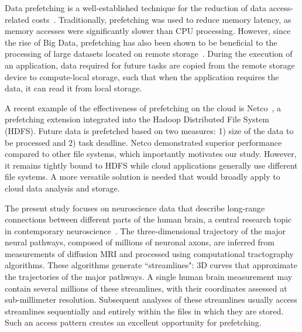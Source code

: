 \documentclass[conference]{IEEEtran}
\begin{document}
Data prefetching
is a well-established technique for the reduction of data access-related costs~\cite{callahan1991software, mowry1992design,
klaiber1991architecture}. Traditionally, prefetching was
used to reduce memory latency, as memory accesses were significantly slower than CPU processing. However, since the rise of Big Data,
prefetching has also been shown to be beneficial to the processing of large
datasets located on remote storage~\cite{yildiz2018improving}. During the
execution of an application, data required for future tasks are
copied from the remote storage device to compute-local storage, such that
when the application requires the data, it can read it from local
storage.

A recent example of the effectiveness of prefetching on the cloud is Netco~\cite{jalaparti2018netco}, a prefetching extension
integrated into the Hadoop Distributed File System (HDFS). Future data is prefetched based on two measures: 1) size of the
data to be processed and 2) task deadline.  Netco demonstrated superior performance compared to other file systems, which importantly motivates our study. However, it remains tightly bound to HDFS while cloud applications generally use different file systems. A more versatile solution is needed that would broadly apply to cloud data analysis and storage.

The present study focuses on neuroscience data that describe long-range
connections between different parts of the human brain, a central research topic in contemporary
neuroscience~\cite{bassett_network_2017}. The three-dimensional trajectory
of the major neural pathways, composed of millions of neuronal axons, are
inferred from measurements of diffusion MRI and processed using computational tractography algorithms. These
algorithms generate ``streamlines": 3D curves that approximate the
trajectories of the major pathways. A single human brain measurement may
contain several millions of these streamlines, with their coordinates
assessed at sub-millimeter resolution. Subsequent analyses of these
streamlines usually access
streamlines sequentially and entirely within the files in which they are stored. Such an access pattern creates an excellent opportunity for prefetching.
\end{document}
